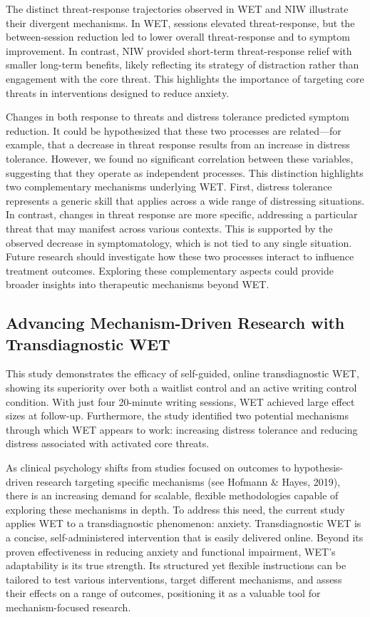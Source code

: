 \documentclass[
  man,floatsintext]{apa7}
\begin{document}
The distinct threat-response trajectories observed in WET and NIW illustrate their divergent mechanisms.
In WET, sessions elevated threat-response, but the between-session reduction led to lower overall threat-response and to symptom improvement.
In contrast, NIW provided short-term threat-response relief with smaller long-term benefits, likely reflecting its strategy of distraction rather than engagement with the core threat.
This highlights the importance of targeting core threats in interventions designed to reduce anxiety.

Changes in both response to threats and distress tolerance predicted symptom reduction.
It could be hypothesized that these two processes are related---for example, that a decrease in threat response results from an increase in distress tolerance.
However, we found no significant correlation between these variables, suggesting that they operate as independent processes.
This distinction highlights two complementary mechanisms underlying WET.
First, distress tolerance represents a generic skill that applies across a wide range of distressing situations.
In contrast, changes in threat response are more specific, addressing a particular threat that may manifest across various contexts.
This is supported by the observed decrease in symptomatology, which is not tied to any single situation.
Future research should investigate how these two processes interact to influence treatment outcomes.
Exploring these complementary aspects could provide broader insights into therapeutic mechanisms beyond WET.

\subsection{Advancing Mechanism-Driven Research with Transdiagnostic WET}\label{advancing-mechanism-driven-research-with-transdiagnostic-wet}

This study demonstrates the efficacy of self-guided, online transdiagnostic WET, showing its superiority over both a waitlist control and an active writing control condition.
With just four 20-minute writing sessions, WET achieved large effect sizes at follow-up.
Furthermore, the study identified two potential mechanisms through which WET appears to work: increasing distress tolerance and reducing distress associated with activated core threats.

As clinical psychology shifts from studies focused on outcomes to hypothesis-driven research targeting specific mechanisms (see Hofmann \& Hayes, 2019), there is an increasing demand for scalable, flexible methodologies capable of exploring these mechanisms in depth.
To address this need, the current study applies WET to a transdiagnostic phenomenon: anxiety.
Transdiagnostic WET is a concise, self-administered intervention that is easily delivered online.
Beyond its proven effectiveness in reducing anxiety and functional impairment, WET's adaptability is its true strength.
Its structured yet flexible instructions can be tailored to test various interventions, target different mechanisms, and assess their effects on a range of outcomes, positioning it as a valuable tool for mechanism-focused research.
\end{document}
